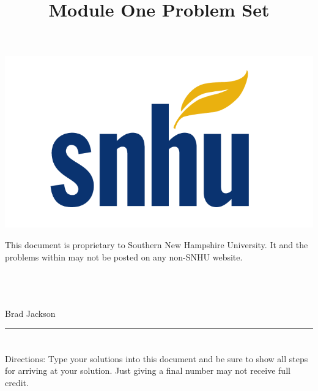\documentclass{amsart}
\theoremstyle{definition}
\theoremstyle{Exercise}
\theoremstyle{remark}
\theoremstyle{rule}
\numberwithin{equation}{section}
\begin{document}
\title{\sf Module One Problem Set}%





\begin{center}
\includegraphics[scale=.1]{snhu_logo.png}
\end{center}

\maketitle 
This document is proprietary to Southern New Hampshire University. It and the problems within may not be posted on any non-SNHU website.
\\\\\\\\
\begin{center}
Brad Jackson
\end{center}

\begin{center}
\rule{\textwidth}{0.4pt}
\end{center}
\newpage


\section*{}


\section*{}
Directions: Type your solutions into this document and be sure to show all steps for arriving at your solution. Just giving a final number may not receive full credit.
\\
\end{document}
